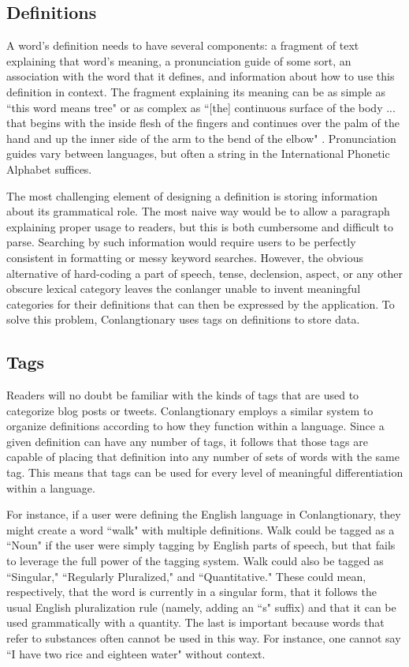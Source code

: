 \subsection{Definitions}
\label{subsec:definitions}
A word's definition needs to have several components: a fragment of text explaining that word's meaning, a pronunciation guide of some sort, an association with the word that it defines, and information about how to use this definition in context. The fragment explaining its meaning can be as simple as ``this word means tree" or as complex as ``[the] continuous surface of the body ... that begins with the inside flesh of the fingers and continues over the palm of the hand and up the inner side of the arm to the bend of the elbow" \cite{native-tongue}. Pronunciation guides vary between languages, but often a string in the International Phonetic Alphabet suffices.

The most challenging element of designing a definition is storing information about its grammatical role. The most naive way would be to allow a paragraph explaining proper usage to readers, but this is both cumbersome and difficult to parse. Searching by such information would require users to be perfectly consistent in formatting or messy keyword searches. However, the obvious alternative of hard-coding a part of speech, tense, declension, aspect, or any other obscure lexical category leaves the conlanger unable to invent meaningful categories for their definitions that can then be expressed by the application. To solve this problem, Conlangtionary uses tags on definitions to store data.

\subsection{Tags}
\label{subsec:tags}
Readers will no doubt be familiar with the kinds of tags that are used to categorize blog posts or tweets. Conlangtionary employs a similar system to organize definitions according to how they function within a language. Since a given definition can have any number of tags, it follows that those tags are capable of placing that definition into any number of sets of words with the same tag. This means that tags can be used for every level of meaningful differentiation within a language.

For instance, if a user were defining the English language in Conlangtionary, they might create a word ``walk" with multiple definitions. Walk could be tagged as a ``Noun" if the user were simply tagging by English parts of speech, but that fails to leverage the full power of the tagging system. Walk could also be tagged as ``Singular," ``Regularly Pluralized," and ``Quantitative." These could mean, respectively, that the word is currently in a singular form, that it follows the usual English pluralization rule (namely, adding an ``s" suffix) and that it can be used grammatically with a quantity. The last is important because words that refer to substances often cannot be used in this way. For instance, one cannot say ``I have two rice and eighteen water" without context.

